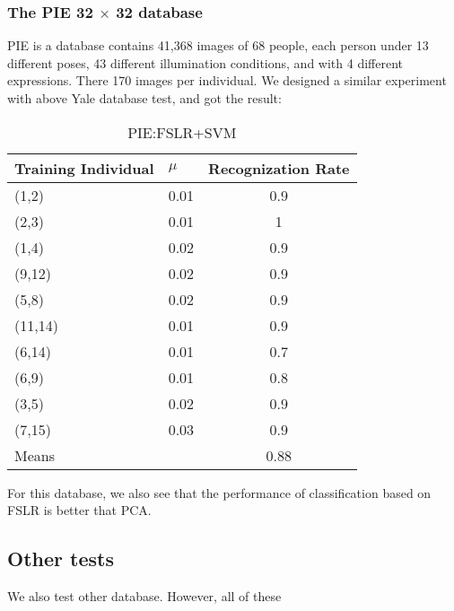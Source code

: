 \documentclass[10pt,journal,final,twocolumn,]{IEEEtran}
\begin{document}
	\subsubsection{\textbf{The PIE 32 $\times$ 32 database}}
	PIE is a database contains 41,368 images of 68 people, each person under 13 different poses, 43 different illumination conditions, and with 4 different expressions. There 170 images per individual.
	We designed a similar experiment with above Yale database test, and got the result:
	\begin{table}[h]
		\centering
		\caption{PIE:FSLR+SVM}
		\begin{tabular}{l|l c}
			\hline
			Training Individual & $\mu$ & Recognization Rate\\
			\hline
			(1,2) & 0.01 & 0.9\\
			(2,3) & 0.01 & 1\\
			(1,4) & 0.02 & 0.9\\
			(9,12) & 0.02 & 0.9\\
			(5,8) & 0.02 & 0.9\\
			(11,14) & 0.01 &0.9\\
			(6,14) & 0.01 & 0.7\\
			(6,9) & 0.01 & 0.8\\
			(3,5) & 0.02 & 0.9\\
			(7,15) & 0.03 & 0.9\\
			\hline
			Means & \qquad & 0.88\\
			\hline
		\end{tabular}
	\end{table}
	
	For this database, we also see that the performance of classification based on FSLR is better that PCA.
	
	\subsection{\textbf{Other tests}}
	We also test other database. However, all of these 
	
	
	
	
	
\end{document}
